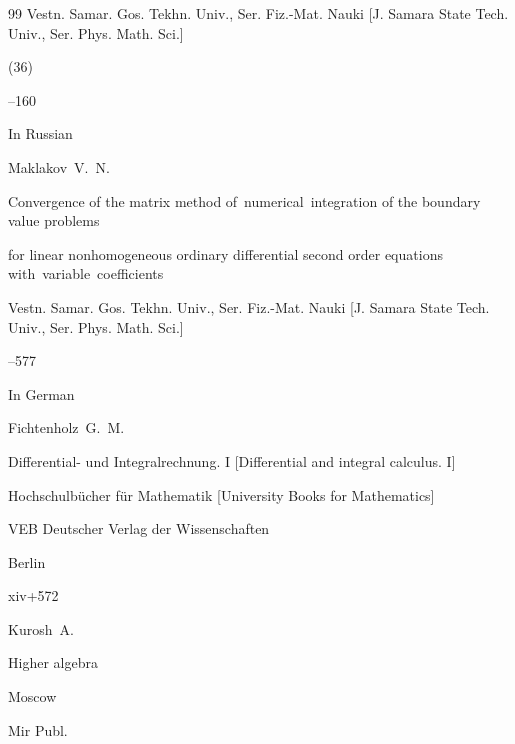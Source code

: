 \begin{thebibliography}{99}
\jour Vestn. Samar. Gos. Tekhn. Univ., Ser. Fiz.-Mat. Nauki \rm [J. Samara State Tech. Univ., Ser. Phys. Math. Sci.]

(36)

--160





\lang In Russian

\by Maklakov~V.~N.

\paper Convergence of the matrix method of~numerical~integration of the boundary value problems

for linear nonhomogeneous ordinary differential second order equations with~variable~coefficients

\jour Vestn. Samar. Gos. Tekhn. Univ., Ser. Fiz.-Mat. Nauki \rm  [J. Samara State Tech. Univ., Ser. Phys. Math. Sci.]




--577







\lang In German

\by Fichtenholz~G.~M.

\book Differential- und Integralrechnung. \rm I [Differential and integral calculus. I] 

\serial Hochschulb\"ucher f\"ur Mathematik \rm [University Books for Mathematics]


\publ VEB Deutscher Verlag der Wissenschaften

\publaddr Berlin


\totalpages xiv+572 






\by Kurosh~A.

\book Higher algebra


\publaddr Moscow

\publ Mir Publ.






\end{thebibliography}
